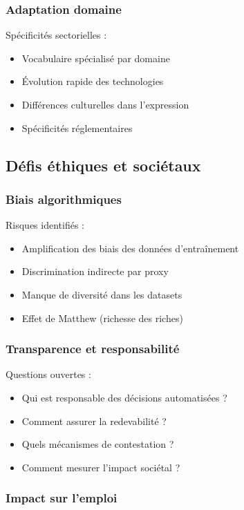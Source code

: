 \documentclass[12pt,a4paper]{report}
\begin{document}
\subsubsection{Adaptation domaine}

Spécificités sectorielles :
\begin{itemize}
\item Vocabulaire spécialisé par domaine
\item Évolution rapide des technologies
\item Différences culturelles dans l'expression
\item Spécificités réglementaires
\end{itemize}

\subsection{Défis éthiques et sociétaux}

\subsubsection{Biais algorithmiques}

Risques identifiés :
\begin{itemize}
\item Amplification des biais des données d'entraînement
\item Discrimination indirecte par proxy
\item Manque de diversité dans les datasets
\item Effet de Matthew (richesse des riches)
\end{itemize}

\subsubsection{Transparence et responsabilité}

Questions ouvertes :
\begin{itemize}
\item Qui est responsable des décisions automatisées ?
\item Comment assurer la redevabilité ?
\item Quels mécanismes de contestation ?
\item Comment mesurer l'impact sociétal ?
\end{itemize}

\subsubsection{Impact sur l'emploi}
\end{document}
